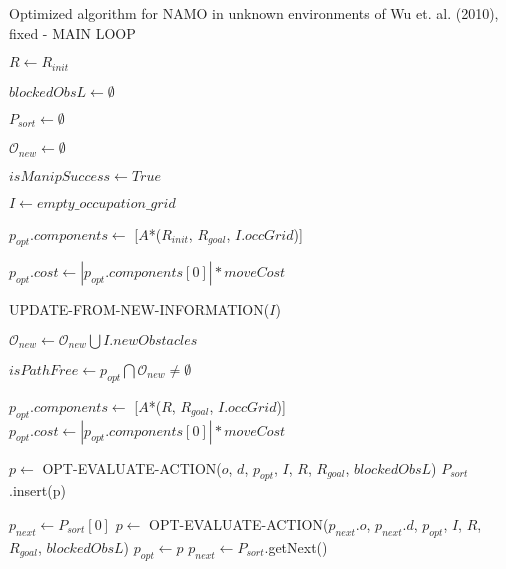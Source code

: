 \begin{algorithm}[H]

  \caption{Optimized algorithm for NAMO in unknown environments of Wu et. al. (2010), fixed - MAIN LOOP}

  \label{alg:01-wu-optimized}

  \begin{algorithmic}[1]


        \State $R \gets R_{init}$

        \State $blockedObsL \gets \emptyset$

        \State $P_{sort} \gets \emptyset$

        \State $\mathcal{O}_{new} \gets \emptyset$

        \State $isManipSuccess \gets True$

        \State $I \gets empty\_occupation\_grid$

        \State $p_{opt}.components \gets$ [$A$*($R_{init}$, $R_{goal}$, $I.occGrid$)]

        \State $p_{opt}.cost \gets |p_{opt}.components[0]| * moveCost$


          \State UPDATE-FROM-NEW-INFORMATION($I$) 

          \State $\mathcal{O}_{new} \gets \mathcal{O}_{new} \bigcup I.newObstacles$

          \State $isPathFree \gets p_{opt} \bigcap \mathcal{O}_{new} \neq \emptyset$ 


            \State $p_{opt}.components \gets$ [$A$*($R$, $R_{goal}$, $I.occGrid$)]
            \State $p_{opt}.cost \gets |p_{opt}.components[0]| * moveCost$

                \State $p \gets$ OPT-EVALUATE-ACTION($o$, $d$, $p_{opt}$, $I$, $R$, $R_{goal}$, $blockedObsL$)
                  \State $P_{sort}$.insert(p)
                \EndIf
              \EndFor
            \EndFor

              \State $p_{next} \gets P_{sort}[0]$
               
                \State $p \gets$ OPT-EVALUATE-ACTION($p_{next}.o$, $p_{next}.d$, $p_{opt}$, $I$, $R$, $R_{goal}$, $blockedObsL$)
                  \State $p_{opt} \gets p$
                \EndIf
                \State $p_{next} \gets P_{sort}$.getNext() 
              \EndWhile
            \EndIf


\end{algorithmic}
\end{algorithm}

